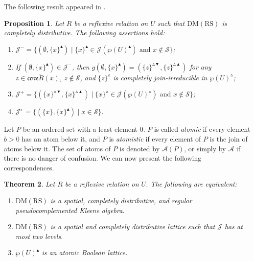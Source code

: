 \documentclass[11pt,a4paper]{amsart}
\newcommand{\UP}{\blacktriangle}
\newcommand{\DOWN}{\blacktriangledown}
\newcommand{\Up}{\vartriangle}
\theoremstyle{plain}
\newtheorem{theorem}{Theorem}[section]
\newtheorem{proposition}[theorem]{Proposition}
\theoremstyle{definition}
\theoremstyle{remark}
\numberwithin{equation}{section}
\begin{document}
The following result appeared in \cite[Proposition 5.3]{JarRad25}.

\begin{proposition} \label{prop:partition_of_J}
Let $R$ be a reflexive relation on $U$ such that 
$\mathrm{DM(RS)}$ is completely distributive. The
following assertions hold:
\begin{enumerate}[label={\rm (\roman*)}, itemsep=4pt]
\item %
$\mathcal{J}^{-} = 
\{(\emptyset ,\{x\}^\UP) \mid \{x\}^\UP \in
\mathcal{J}(\wp (U)^{\UP}) \text{ and } x \notin \mathcal{S} \}$;

\item %
If $(\emptyset ,\{x\}^\UP) \in \mathcal{J}^{-}$, then
$g(\emptyset,\{x\}^\UP) =  (\{z\}^{\Up \DOWN}, \{z\}^{\Up \UP})$
for any $z\in \mathfrak{core}\breve{R}(x)$, $z \notin \mathcal{S}$,
and $\{z\}^\Up$ is completely join-irreducible in  
$\wp(U)^\Up$;

\item %
$\mathcal{J}^{+} = \{(\{x\}^{\Up \DOWN},\{x\}^{\Up \UP}) \mid 
\{x\}^\Up \in \mathcal{J}(\wp(U)^\Up) \text{ and }
x \notin \mathcal{S} \}$;

\item %
$\mathcal{J}^{\circ}$ = $\{(\{x\},\{x\}^\UP)\mid x\in \mathcal{S} \}$.
\end{enumerate}
\end{proposition}

Let $P$ be an ordered set with a least element $0$. $ P$ is called \emph{atomic} if 
every element $b>0$ has an atom below it, and $P$ is \emph{atomistic} if every element of $P$ is 
the join of atoms below it. The set of atoms of $P$ is denoted by
$\mathcal{A}(P)$, or simply by $\mathcal{A}$ if there
is no danger of confusion.
We can now present the following correspondences.

\begin{theorem} \label{thm:Stone_vs_Boolean}
Let $R$ be a reflexive relation on $U$. 
The following are equivalent:
\begin{enumerate}[label={\rm (\roman*)}]
\item  $\mathrm{DM(RS)}$ is a spatial, completely distributive, and regular 
pseudocomplemented Kleene algebra.
\item $\mathrm{DM(RS)}$ is a spatial and completely distributive lattice 
such that $\mathcal{J}$ has at most two levels.
\item $\wp(U)^\UP$ is an atomic Boolean lattice.
\end{enumerate}  
\end{theorem}
    
\end{document}
